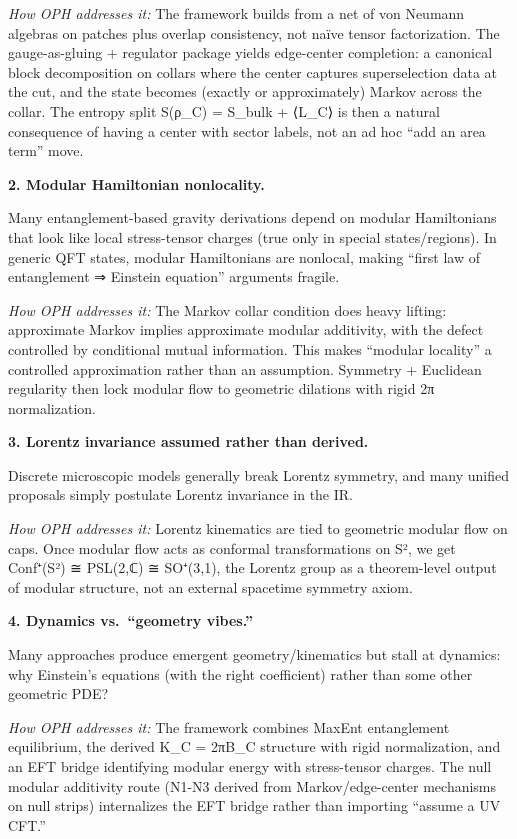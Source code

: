 \documentclass[
]{article}
\begin{document}
\emph{How OPH addresses it:} The framework builds from a net of von
Neumann algebras on patches plus overlap consistency, not naïve tensor
factorization. The gauge-as-gluing + regulator package yields
edge-center completion: a canonical block decomposition on collars where
the center captures superselection data at the cut, and the state
becomes (exactly or approximately) Markov across the collar. The entropy
split S(ρ\_C) = S\_bulk + ⟨L\_C⟩ is then a natural consequence of having
a center with sector labels, not an ad hoc ``add an area term'' move.

\textbf{2. Modular Hamiltonian nonlocality.}

Many entanglement-based gravity derivations depend on modular
Hamiltonians that look like local stress-tensor charges (true only in
special states/regions). In generic QFT states, modular Hamiltonians are
nonlocal, making ``first law of entanglement ⇒ Einstein equation''
arguments fragile.

\emph{How OPH addresses it:} The Markov collar condition does heavy
lifting: approximate Markov implies approximate modular additivity, with
the defect controlled by conditional mutual information. This makes
``modular locality'' a controlled approximation rather than an
assumption. Symmetry + Euclidean regularity then lock modular flow to
geometric dilations with rigid 2π normalization.

\textbf{3. Lorentz invariance assumed rather than derived.}

Discrete microscopic models generally break Lorentz symmetry, and many
unified proposals simply postulate Lorentz invariance in the IR.

\emph{How OPH addresses it:} Lorentz kinematics are tied to geometric
modular flow on caps. Once modular flow acts as conformal
transformations on S², we get Conf⁺(S²) ≅ PSL(2,ℂ) ≅ SO⁺(3,1), the
Lorentz group as a theorem-level output of modular structure, not an
external spacetime symmetry axiom.

\textbf{4. Dynamics vs.~``geometry vibes.''}

Many approaches produce emergent geometry/kinematics but stall at
dynamics: why Einstein's equations (with the right coefficient) rather
than some other geometric PDE?

\emph{How OPH addresses it:} The framework combines MaxEnt entanglement
equilibrium, the derived K\_C = 2πB\_C structure with rigid
normalization, and an EFT bridge identifying modular energy with
stress-tensor charges. The null modular additivity route (N1-N3 derived
from Markov/edge-center mechanisms on null strips) internalizes the EFT
bridge rather than importing ``assume a UV CFT.''
\end{document}
